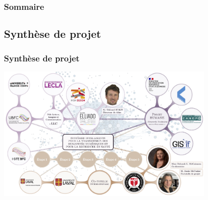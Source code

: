 \documentclass[xcolor=dvipsnames]{beamer}
\begin{document}
\begin{frame}
\frametitle{Sommaire}
\tableofcontents[currentsection]
\end{frame}

\subsection{Synthèse de projet}
\begin{frame}[fragile]
\frametitle{Synthèse de projet}
\includegraphics[height = 6.7cm]{images/mindmap.png}
\end{frame}


\end{document}
